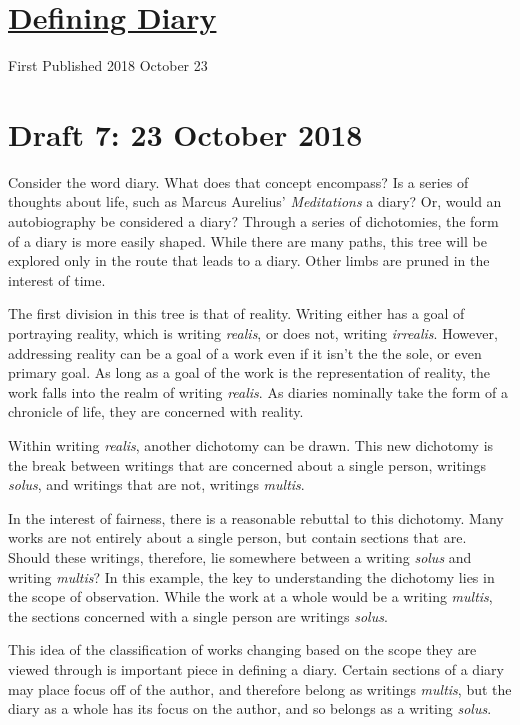 \documentclass[12pt]{article}[titlepage]
\newcommand{\1}{\={a}}
\newcommand{\2}{\={e}}
\newcommand{\3}{\={\i}}
\newcommand{\4}{\=o}
\newcommand{\5}{\=u}
\newcommand{\6}{\={A}}
\renewcommand{\,}{\textsuperscript{,}}
\begin{document}
\doublespacing
\section{\href{defining-diary.html}{Defining Diary}}
First Published 2018 October 23
\section{Draft 7: 23 October 2018}
Consider the word diary.
What does that concept encompass?
Is a series of thoughts about life, such as Marcus Aurelius' \textit{Meditations} a diary?
Or, would an autobiography be considered a diary?
Through a series of dichotomies, the form of a diary is more easily shaped. 
While there are many paths, this tree will be explored only in the route that leads to a diary.
Other limbs are pruned in the interest of time.

The first division in this tree is that of reality.
Writing either has a goal of portraying reality, which is writing \textit{realis}, or does not, writing \textit{irrealis}.
However, addressing reality can be a goal of a work even if it isn't the the sole, or even primary goal.
As long as a goal of the work is the representation of reality, the work falls into the realm of writing \textit{realis}.
As diaries nominally take the form of a chronicle of life, they are concerned with reality.

Within writing \textit{realis}, another dichotomy can be drawn.
This new dichotomy is the break between writings that are concerned about a single person, writings \textit{solus}, and writings that are not, writings \textit{multis}.

In the interest of fairness, there is a reasonable rebuttal to this dichotomy.
Many works are not entirely about a single person, but contain sections that are.
Should these writings, therefore, lie somewhere between a writing \textit{solus} and writing \textit{multis}?
In this example, the key to understanding the dichotomy lies in the scope of observation.
While the work at a whole would be a writing \textit{multis}, the sections concerned with a single person are writings \textit{solus}.

This idea of the classification of works changing based on the scope they are viewed through is important piece in defining a diary.
Certain sections of a diary may place focus off of the author, and therefore belong as writings \textit{multis}, but the diary as a whole has its focus on the author, and so belongs as a writing \textit{solus}.
\end{document}
